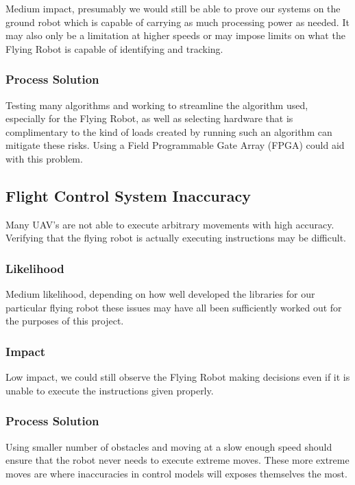 \documentclass{article}
\begin{document}
		Medium impact, presumably we would still be able to prove our systems on the ground robot which is capable of carrying as much processing power as needed. It may also only be a limitation at higher speeds or may impose limits on what the Flying Robot is capable of identifying and tracking. 
		
		\subsubsection{Process Solution}
		
		Testing many algorithms and working to streamline the algorithm used, especially for the Flying Robot, as well as selecting hardware that is complimentary to the kind of loads created by running such an algorithm can mitigate these risks. Using a Field Programmable Gate Array (FPGA) could aid with this problem.
	
	\subsection{Flight Control System Inaccuracy}
	
	Many UAV's are not able to execute arbitrary movements with high accuracy. Verifying that the flying robot is actually executing instructions may be difficult. 
	
		\subsubsection{Likelihood}
		
		Medium likelihood, depending on how well developed the libraries for our particular flying robot these issues may have all been sufficiently worked out for the purposes of this project.
		
		\subsubsection{Impact}
		
		Low impact, we could still observe the Flying Robot making decisions even if it is unable to execute the instructions given properly.
		
		\subsubsection{Process Solution}
		
		Using smaller number of obstacles and moving at a slow enough speed should ensure that the robot never needs to execute extreme moves. These more extreme moves are where inaccuracies in control models will exposes themselves the most. 
\end{document}
